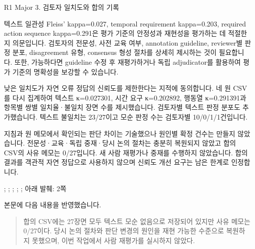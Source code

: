 \clearpage

\begin{reviewitem}{R1 Major 3. 검토자 일치도와 합의 기록}

\begin{reviewercomment}

텍스트 일관성 Fleiss' kappa=0.027, temporal requirement kappa=0.203, required action sequence kappa=0.291은 평가 기준의 안정성과 재현성을 평가하는 데 적절한지 의문입니다. 검토자의 전문성, 사전 교육 여부, annotation guideline, reviewer별 판정 분포, disagreement 유형, consensus 형성 절차를 상세히 제시하는 것이 필요합니다. 또한, 가능하다면 guideline 수정 후 재평가하거나 독립 adjudicator를 활용하여 평가 기준의 명확성을 보강할 수 있습니다.

\end{reviewercomment}

\begin{authorresponse}

낮은 일치도가 자연 오류 정답의 신뢰도를 제한한다는 지적에 동의합니다. 네 원 CSV를 다시 집계하여 텍스트 κ=0.027301, 시간 요구 κ=0.202892, 행동열 κ=0.291391과 항목별 쌍별 일치율·불일치 장면 수를 제시했습니다. 검토자별 텍스트 판정 분포도 추가했습니다. 텍스트 불일치는 23/27이고 모순 판정 수는 검토자별 10/0/1/1건입니다.

지침과 원 메모에서 확인되는 판단 차이는 기술했으나 원인별 확정 건수는 만들지 않았습니다. 전문성·교육·독립 중재·당시 논의 절차는 충분히 복원되지 않았고 합의 CSV의 사유 메모는 0/27입니다. 새 사람 재평가나 중재를 수행하지 않았습니다. 합의 결과를 객관적 자연 정답으로 사용하지 않으며 신뢰도 개선 요구는 남은 한계로 인정합니다.

\end{authorresponse}

\begin{manuscriptrevision}{; ; ; ; ; 아래 발췌: 2쪽}

본문에 다음 내용을 반영했습니다.

\begin{quote}

합의 CSV에는 27장면 모두 텍스트 모순 없음으로 저장되어 있지만 사유 메모는 0/27이다. 당시 논의 절차와 판단 변경의 원인을 재현 가능한 수준으로 복원하지 못했으며, 이번 작업에서 사람 재평가를 실시하지 않았다.

\end{quote}

\end{manuscriptrevision}

\end{reviewitem}

